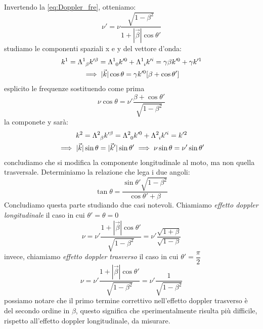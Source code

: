 Invertendo la \eqref{eq:Doppler_fre}, otteniamo:
\begin{equation}
        \nu'=\nu\dfrac{\sqrt{1-\beta^2}}{1+|\Vec{\beta}|\cos{\theta'}}
\end{equation}
studiamo le componenti spaziali x e y del vettore d'onda:
\begin{equation}
   \begin{gathered}
       k^1=\Lambda\indices{^1_\beta} k'^{\beta}=\Lambda\indices{^1_0} k'^{0}+\Lambda\indices{^1_i} k'^{i}=\gamma\beta k'^{0}+\gamma k'^{1}\\
       \implies|\Vec{k}|\cos{\theta}=\gamma k'^{0}[ \beta+\cos{\theta'}]
   \end{gathered}
\end{equation}
esplicito le frequenze sostituendo come prima 
\begin{equation}
     \nu\cos{\theta}=\nu'\dfrac{\beta+\cos{\theta'}}{\sqrt{1-\beta^2}}
\end{equation}
la componete y sarà:
\begin{equation}
   \begin{gathered}
       k^2=\Lambda\indices{^2_\beta} k'^{\beta}=\Lambda\indices{^2_0} k'^{0}+\Lambda\indices{^2_i} k'^{i}= k'^{2}\\
       \implies|\Vec{k}|\sin{\theta}=|\Vec{k}'|\sin{\theta'}\implies \nu\sin{\theta}=\nu'\sin{\theta'}
   \end{gathered}
\end{equation}
concludiamo che si modifica la componente longitudinale al moto, ma non quella trasversale. Determiniamo la relazione che lega i due angoli:
\begin{equation}
     \tan{\theta}=\dfrac{\sin{\theta'}\sqrt{1-\beta^2}}{\cos{\theta'}+\beta}
\end{equation}
Concludiamo questa parte studiando due casi notevoli. Chiamiamo \textit{effetto doppler longitudinale} il caso in cui $\theta'=\theta=0$
\begin{equation}
    \nu=\nu'\dfrac{1+|\Vec{\beta}|\cos{\theta'}}{\sqrt{1-\beta^2}}=\nu'\dfrac{\sqrt{1+\beta}}{\sqrt{1-\beta}}
\end{equation}
 invece, chiamiamo \textit{effetto doppler trasverso} il caso in cui $\theta'=\dfrac{\pi}{2}$
\begin{equation}
    \nu=\nu'\dfrac{1+|\Vec{\beta}|\cos{\theta'}}{\sqrt{1-\beta^2}}=\nu'\dfrac{1}{\sqrt{1-\beta^2}}
\end{equation}
possiamo notare che il primo termine correttivo nell'effetto doppler trasverso è del secondo ordine in $\beta$, questo significa che sperimentalmente risulta più difficile, rispetto all'effetto doppler longitudinale, da misurare.

